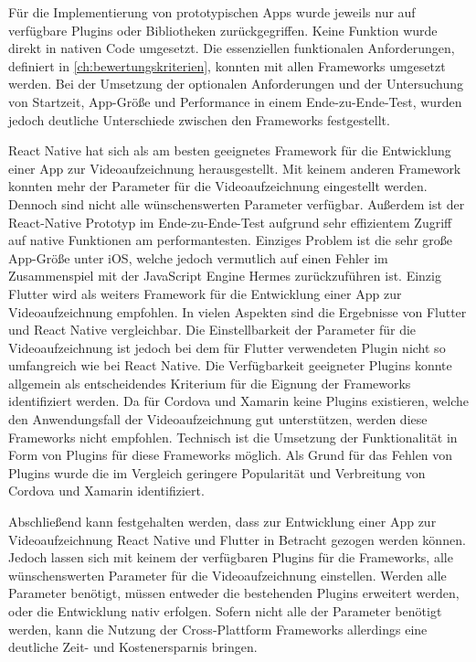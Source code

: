 Für die Implementierung von prototypischen Apps wurde jeweils nur auf verfügbare Plugins oder Bibliotheken zurückgegriffen.
Keine Funktion wurde direkt in nativen Code umgesetzt.
Die essenziellen funktionalen Anforderungen, definiert in \autoref{ch:bewertungskriterien}, konnten mit allen Frameworks umgesetzt werden.
Bei der Umsetzung der optionalen Anforderungen und der Untersuchung von Startzeit, App-Größe und Performance in einem Ende-zu-Ende-Test, wurden jedoch deutliche Unterschiede zwischen den Frameworks festgestellt.

React Native hat sich als am besten geeignetes Framework für die Entwicklung einer App zur Videoaufzeichnung herausgestellt.
Mit keinem anderen Framework konnten mehr der Parameter für die Videoaufzeichnung eingestellt werden.
Dennoch sind nicht alle wünschenswerten Parameter verfügbar.
Außerdem ist der React-Native Prototyp im Ende-zu-Ende-Test aufgrund sehr effizientem Zugriff auf native Funktionen am performantesten.
Einziges Problem ist die sehr große App-Größe unter iOS, welche jedoch vermutlich auf einen Fehler im Zusammenspiel mit der JavaScript Engine Hermes zurückzuführen ist.
Einzig Flutter wird als weiters Framework für die Entwicklung einer App zur Videoaufzeichnung empfohlen.
In vielen Aspekten sind die Ergebnisse von Flutter und React Native vergleichbar.
Die Einstellbarkeit der Parameter für die Videoaufzeichnung ist jedoch bei dem für Flutter verwendeten Plugin nicht so umfangreich wie bei React Native.
Die Verfügbarkeit geeigneter Plugins konnte allgemein als entscheidendes Kriterium für die Eignung der Frameworks identifiziert werden.
Da für Cordova und Xamarin keine Plugins existieren, welche den Anwendungsfall der Videoaufzeichnung gut unterstützen, werden diese Frameworks nicht empfohlen.
Technisch ist die Umsetzung der Funktionalität in Form von Plugins für diese Frameworks möglich.
Als Grund für das Fehlen von Plugins wurde die im Vergleich geringere Popularität und Verbreitung von Cordova und Xamarin identifiziert.


Abschließend kann festgehalten werden, dass zur Entwicklung einer App zur Videoaufzeichnung React Native und Flutter in Betracht gezogen werden können.
Jedoch lassen sich mit keinem der verfügbaren Plugins für die Frameworks, alle wünschenswerten Parameter für die Videoaufzeichnung einstellen.
Werden alle Parameter benötigt, müssen entweder die bestehenden Plugins erweitert werden, oder die Entwicklung nativ erfolgen.
Sofern nicht alle der Parameter benötigt werden, kann die Nutzung der Cross-Plattform Frameworks allerdings eine deutliche Zeit- und Kostenersparnis bringen.
